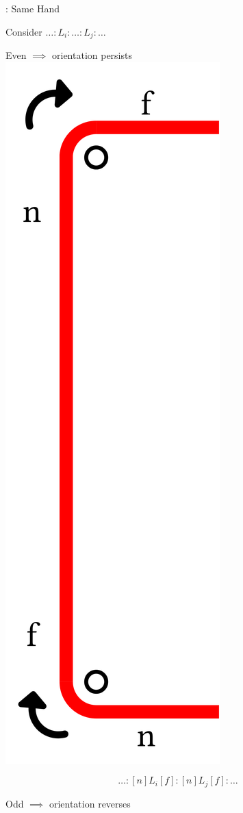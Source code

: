\begin{frame}{\subsecname: Same Hand}
\begin{adjustwidth}{-1.5em}{-1.5em}
Consider $\ldots:L_i:\ldots:L_j:\ldots$

\vfill
\pause
\begin{minipage}{0.5\textwidth}
\begin{center}
Even $\implies$ orientation persists\\
\includegraphics[width=0.3\linewidth]{figures/same-even.png}
\end{center}
$$
\scriptstyle
\ldots:[n]L_i[f]:[n]L_j[f]:\ldots
$$
\end{minipage}
\hfill
\pause
\begin{minipage}{0.5\textwidth}
\begin{center}
Odd $\implies$ orientation reverses\\

\end{center}
\end{minipage}
\end{adjustwidth}
\end{frame}
